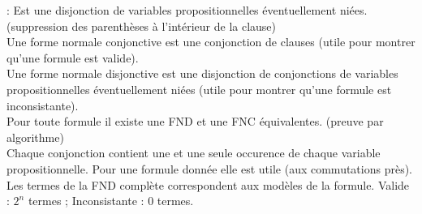  : Est une disjonction de variables propositionnelles éventuellement niées. (suppression des parenthèses à l'intérieur de la clause)\\

 Une forme normale conjonctive est une conjonction de clauses (utile pour montrer qu'une formule est valide). \\

 Une forme normale disjonctive est une disjonction de conjonctions de variables propositionnelles éventuellement niées (utile pour montrer qu'une formule est inconsistante).\\

 Pour toute formule il existe une FND et une FNC équivalentes. (preuve par algorithme) \\

 Chaque conjonction contient une et une seule occurence de chaque variable propositionnelle. Pour une formule donnée elle est utile (aux commutations près). 
\\

 Les termes de la FND complète correspondent aux modèles de la formule. Valide : $2^n$ termes ; Inconsistante : $0$ termes.
